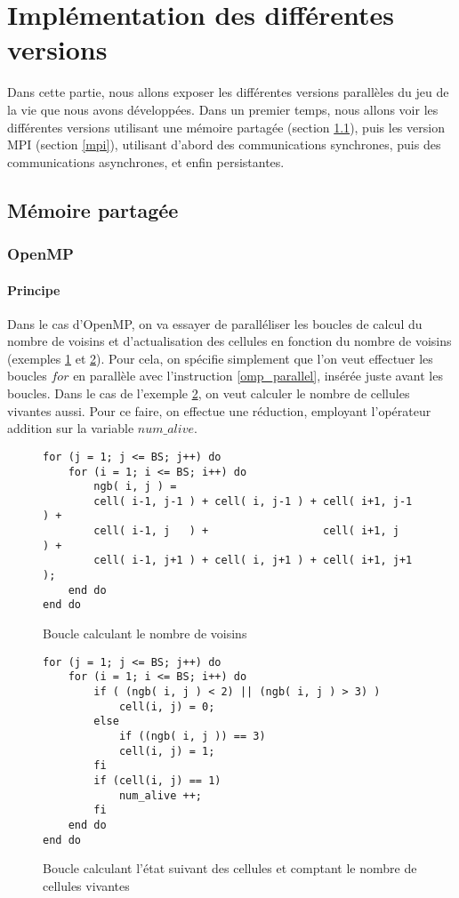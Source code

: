 \section{Implémentation des différentes versions} %
\label{sec:diff_rents_versions}
Dans cette partie, nous allons exposer les différentes versions parallèles du jeu de la vie que nous avons développées. Dans un premier temps, nous allons voir les différentes versions utilisant une mémoire partagée (section \ref{partagee}), puis les version MPI (section \ref{mpi}), utilisant d'abord des communications synchrones, puis des communications asynchrones, et enfin persistantes.

\subsection{Mémoire partagée}
\label{partagee}

\subsubsection{OpenMP}
\label{openmp}
\paragraph{Principe}
Dans le cas d'OpenMP, on va essayer de paralléliser les boucles de calcul du nombre de voisins et d'actualisation des cellules en fonction du nombre de voisins (exemples \ref{boucle_voisins} et \ref{boucle_actualisation}). Pour cela, on spécifie simplement que l'on veut effectuer les boucles $for$ en parallèle avec l'instruction \ref{omp_parallel}, insérée juste avant les boucles. Dans le cas de l'exemple \ref{boucle_actualisation}, on veut calculer le nombre de cellules vivantes aussi. Pour ce faire, on effectue une réduction, employant l'opérateur addition sur la variable $num\_alive$. 

\begin{figure}[h!]
\begin{lstlisting}
for (j = 1; j <= BS; j++) do
	for (i = 1; i <= BS; i++) do
		ngb( i, j ) =
		cell( i-1, j-1 ) + cell( i, j-1 ) + cell( i+1, j-1 ) +
		cell( i-1, j   ) +                  cell( i+1, j   ) +
		cell( i-1, j+1 ) + cell( i, j+1 ) + cell( i+1, j+1 );
	end do
end do
\end{lstlisting}
\caption{Boucle calculant le nombre de voisins}
\label{boucle_voisins}
\end{figure}


\begin{figure}[h!]
\begin{lstlisting}
for (j = 1; j <= BS; j++) do
	for (i = 1; i <= BS; i++) do
		if ( (ngb( i, j ) < 2) || (ngb( i, j ) > 3) ) 
			cell(i, j) = 0;
		else 
			if ((ngb( i, j )) == 3)
			cell(i, j) = 1;
		fi
		if (cell(i, j) == 1) 
			num_alive ++;
		fi
	end do
end do
\end{lstlisting}
\caption{Boucle calculant l'état suivant des cellules et comptant le nombre de cellules vivantes}
\label{boucle_actualisation}
\end{figure}

